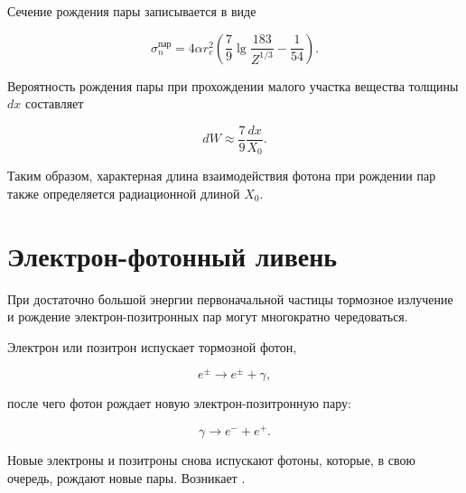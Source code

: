 \documentclass[../final.tex]{subfiles}
\begin{document}
Сечение рождения пары записывается в виде

\begin{equation*}
    \sigma_n^{\text{пар}}
    =
    4\alpha r_e^2
    \left(
        \frac{7}{9}
        \lg\frac{183}{Z^{1/3}}
        -
        \frac{1}{54}
    \right).
\end{equation*}

Вероятность рождения пары при прохождении малого участка вещества
толщины $dx$ составляет

\begin{equation*}
    dW
    \approx
    \frac{7}{9}
    \frac{dx}{X_0}.
\end{equation*}

Таким образом, характерная длина взаимодействия фотона
при рождении пар также определяется радиационной длиной $X_0$.


\section{Электрон-фотонный ливень}

При достаточно большой энергии первоначальной частицы
тормозное излучение и рождение электрон-позитронных пар
могут многократно чередоваться.

Электрон или позитрон испускает тормозной фотон,

\begin{equation*}
    e^\pm
    \rightarrow
    e^\pm+\gamma,
\end{equation*}

после чего фотон рождает новую электрон-позитронную пару:

\begin{equation*}
    \gamma
    \rightarrow
    e^-+e^+.
\end{equation*}

Новые электроны и позитроны снова испускают фотоны,
которые, в свою очередь, рождают новые пары.
Возникает .
\end{document}
